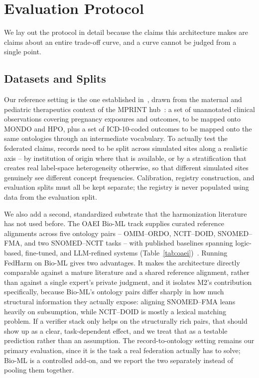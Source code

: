 \documentclass[conference]{IEEEtran}
\begin{document}
\section{Evaluation Protocol}
\label{sec:protocol}

We lay out the protocol in detail because the claims this architecture makes are claims about an entire trade-off curve, and a curve cannot be judged from a single point.

\subsection{Datasets and Splits}

Our reference setting is the one established in~\cite{b1}, drawn from the maternal and pediatric therapeutics context of the MPRINT hub~\cite{b37}: a set of unannotated clinical observations covering pregnancy exposures and outcomes, to be mapped onto MONDO and HPO, plus a set of ICD-10-coded outcomes to be mapped onto the same ontologies through an intermediate vocabulary. To actually test the federated claims, records need to be split across simulated sites along a realistic axis -- by institution of origin where that is available, or by a stratification that creates real label-space heterogeneity otherwise, so that different simulated sites genuinely see different concept frequencies. Calibration, registry construction, and evaluation splits must all be kept separate; the registry is never populated using data from the evaluation split.

We also add a second, standardized substrate that the harmonization literature has not used before. The OAEI Bio-ML track supplies curated reference alignments across five ontology pairs -- OMIM--ORDO, NCIT--DOID, SNOMED--FMA, and two SNOMED--NCIT tasks -- with published baselines spanning logic-based, fine-tuned, and LLM-refined systems (Table~\ref{tab:oaei})~\cite{b55,b54}. Running FedHarm on Bio-ML gives two advantages. It makes the architecture directly comparable against a mature literature and a shared reference alignment, rather than against a single expert's private judgment, and it isolates M2's contribution specifically, because Bio-ML's ontology pairs differ sharply in how much structural information they actually expose: aligning SNOMED--FMA leans heavily on subsumption, while NCIT--DOID is mostly a lexical matching problem. If a verifier stack only helps on the structurally rich pairs, that should show up as a clear, task-dependent effect, and we treat that as a testable prediction rather than an assumption. The record-to-ontology setting remains our primary evaluation, since it is the task a real federation actually has to solve; Bio-ML is a controlled add-on, and we report the two separately instead of pooling them together.
\end{document}

